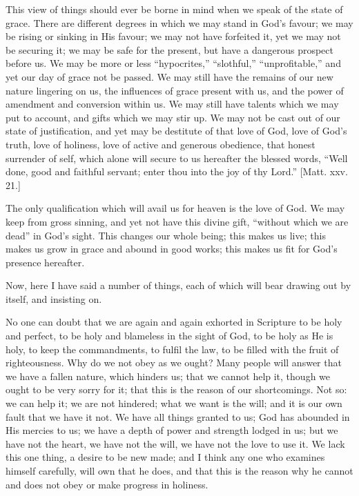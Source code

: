 This view of things should ever be borne in mind when we speak of
the state of grace. There are different degrees in which we may stand
in God's favour; we may be rising or sinking in His favour; we may not
have forfeited it, yet we may not be securing it; we may be safe for
the present, but have a dangerous prospect before us. We may be more
or less ``hypocrites,'' ``slothful,''
``unprofitable,'' and yet our day of grace not be passed. We
may still have the remains of our new nature lingering on us, the
influences of grace present with us, and the power of amendment and
conversion within us. We may still have talents which we may put to
account, and gifts which we may stir up. We may not be cast out of our
state of justification, and yet may be destitute of that love of God,
love of God's truth, love of holiness, love of active and generous
obedience, that honest surrender of self, which alone will secure to
us hereafter the blessed words, ``Well done, good and faithful
servant; enter thou into the joy of thy Lord.'' [Matt. xxv. 21.]

The only qualification which will avail us for heaven is the love
of God. We may keep from gross sinning, and yet not have this divine
gift, ``without which we are dead'' in God's sight. This
changes our whole being; this makes us live; this makes us grow in
grace and abound in good works; this makes us fit for God's presence
hereafter.

Now, here I have said a number of things, each of which will bear
drawing out by itself, and insisting on.

No one can doubt that we are again and again exhorted in Scripture
to be holy and perfect, to be holy and blameless in the sight of God,
to be holy as He is holy, to keep the commandments, to fulfil the law,
to be filled with the fruit of righteousness. Why do we not obey as we
ought? Many people will answer that we have a fallen nature, which
hinders us; that we cannot help it, though we ought to be very sorry
for it; that this is the reason of our shortcomings. Not so: we can
help it; we are not hindered; what we want is the will; and it is our
own fault that we have it not. We have all things granted to us; God
has abounded in His mercies to us; we have a depth of power and
strength lodged in us; but we have not the heart, we have not the
will, we have not the love to use it. We lack this one thing, a desire
to be new made; and I think any one who examines himself carefully,
will own that he does, and that this is the reason why he cannot and
does not obey or make progress in holiness.

